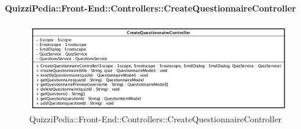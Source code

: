 \paragraph[QuizziPedia::Front-End::Controllers\\::CreateQuestionnaireController]{QuizziPedia::Front-End::Controllers::CreateQuestionnaireController}
\begin{figure} [ht]
	\centering
	\includegraphics[scale=0.45]{UML/Classi/Front-End/QuizziPedia_Front-end_Controller_CreateQuestionnaireController.png}
	\caption{QuizziPedia::Front-End::Controllers::CreateQuestionnaireController}
\end{figure} \FloatBarrier
